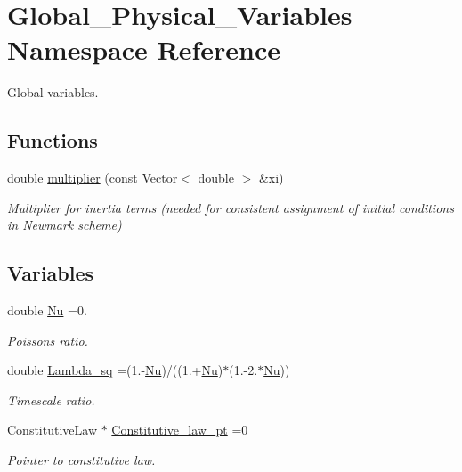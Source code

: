 \hypertarget{namespaceGlobal__Physical__Variables}{}\section{Global\+\_\+\+Physical\+\_\+\+Variables Namespace Reference}
\label{namespaceGlobal__Physical__Variables}


Global variables.  


\subsection*{Functions}
\begin{DoxyCompactItemize}
\item 
double \hyperlink{namespaceGlobal__Physical__Variables_a01099bce3441c7fe79ac6926800097a8}{multiplier} (const Vector$<$ double $>$ \&xi)
\begin{DoxyCompactList}\small\item\em Multiplier for inertia terms (needed for consistent assignment of initial conditions in Newmark scheme) \end{DoxyCompactList}\end{DoxyCompactItemize}
\subsection*{Variables}
\begin{DoxyCompactItemize}
\item 
double \hyperlink{namespaceGlobal__Physical__Variables_a3962c36313826b19f216f6bbbdd6a477}{Nu} =0.
\begin{DoxyCompactList}\small\item\em Poisson\textquotesingle{}s ratio. \end{DoxyCompactList}\item 
double \hyperlink{namespaceGlobal__Physical__Variables_a6fe17557ceb32dd353827fba60408363}{Lambda\+\_\+sq} =(1.-\/\hyperlink{namespaceGlobal__Physical__Variables_a3962c36313826b19f216f6bbbdd6a477}{Nu})/((1.+\hyperlink{namespaceGlobal__Physical__Variables_a3962c36313826b19f216f6bbbdd6a477}{Nu})$\ast$(1.-\/2.$\ast$\hyperlink{namespaceGlobal__Physical__Variables_a3962c36313826b19f216f6bbbdd6a477}{Nu}))
\begin{DoxyCompactList}\small\item\em Timescale ratio. \end{DoxyCompactList}\item 
Constitutive\+Law $\ast$ \hyperlink{namespaceGlobal__Physical__Variables_a2a37fb040c832ee7a086bb13bb02a100}{Constitutive\+\_\+law\+\_\+pt} =0
\begin{DoxyCompactList}\small\item\em Pointer to constitutive law. \end{DoxyCompactList}\end{DoxyCompactItemize}


